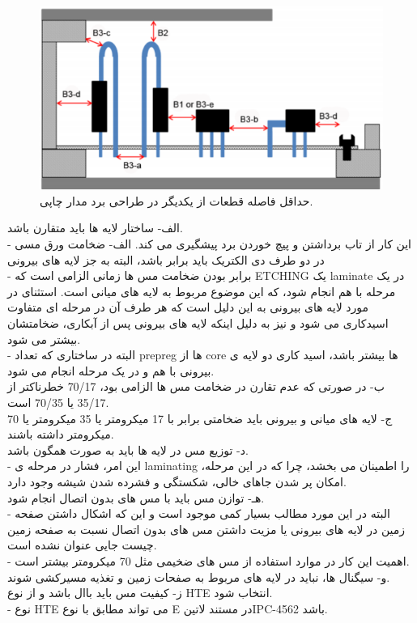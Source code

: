 \begin{figure}[!h]
	\centering
	\includegraphics[width=0.7\linewidth]{Assets/pcbcomponentdistance.png}
	\caption{حداقل فاصله قطعات از یکدیگر در طراحی برد مدار چاپی.}
	\label{fig:pcbcomponentdistance}
\end{figure}

الف- ساختار لایه ها باید متقارن باشد.\\
- این کار از تاب برداشتن و پیچ خوردن برد پیشگیری می کند.
الف- ضخامت ورق مسی در دو طرف دی الکتریک باید برابر باشد، البته به جز لایه های بیرونی\\
- برابر بودن ضخامت مس ها زمانی الزامی است که
ETCHING یک laminate در یک مرحله
با هم انجام شود، که این موضوع مربوط به لایه های میانی است. استثنای در مورد لایه
های بیرونی به این دلیل است که هر طرف آن در مرحله ای متفاوت اسیدکاری می شود
و نیز به دلیل اینکه لایه های بیرونی پس از آبکاری، ضخامتشان بیشتر می شود.\\
- البته در ساختاری که تعداد prepreg ها از core ها بیشتر باشد، اسید کاری دو لایه ی
بیرونی با هم و در یک مرحله انجام می شود.\\
ب- در صورتی که عدم تقارن در ضخامت مس ها الزامی بود، 70/17 خطرناکتر از 35/17 یا 70/35
است.\\
ج- لایه های میانی و بیرونی باید ضخامتی برابر با 17 میکرومتر یا 35 میکرومتر یا 70 میکرومتر داشته باشند.\\
د- توزیع مس در لایه ها باید به صورت همگون باشد.\\
- این امر، فشار در مرحله ی laminating را اطمینان می بخشد، چرا که در این مرحله،
امکان پر شدن جاهای خالی، شکستگی و فشرده شدن شیشه وجود دارد.\\
هـ- توازن مس باید با مس های بدون اتصال انجام شود.\\
- البته در این مورد مطالب بسیار کمی موجود است و این که اشکال داشتن صفحه
زمین در لایه های بیرونی یا مزیت داشتن مس های بدون اتصال نسبت به صفحه
زمین چیست جایی عنوان نشده است.\\
- اهمیت این کار در موارد استفاده از مس های ضخیمی مثل 70 میکرومتر بیشتر است.\\
و- سیگنال ها، نباید در لایه های مربوط به صفحات زمین و تغذیه مسیرکشی شوند.\\
ز- کیفیت مس باید باال باشد و از نوع HTE انتخاب شود.\\
- نوع HTE می تواند مطابق با نوع E در مستند ‌لاتین{IPC-4562} باشد.

